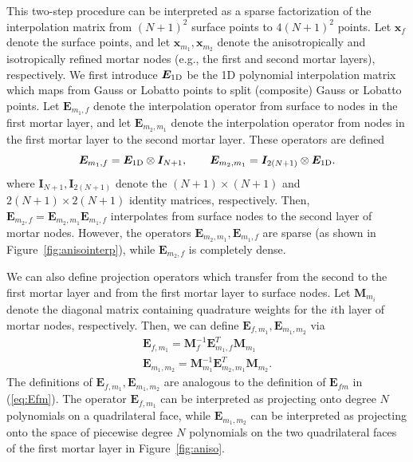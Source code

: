 \documentclass{svjour3}                     %
\begin{document}
This two-step procedure can be interpreted as a sparse factorization of the interpolation matrix from $(N+1)^2$ surface points to $4(N+1)^2$ points.  Let $\bm{x}_f$ denote the surface points, and let $\bm{x}_{m_1}, \bm{x}_{m_2}$ denote the anisotropically and isotropically refined mortar nodes (e.g., the first and second mortar layers), respectively.  We first introduce $\bm{E}_{\rm 1D}$ be the 1D polynomial interpolation matrix which maps from Gauss or Lobatto points to split (composite) Gauss or Lobatto points.  Let $\bm{E}_{m_1,f}$ denote the interpolation operator from surface to nodes in the first mortar layer, and let $\bm{E}_{m_2,m_1}$ denote the interpolation operator from nodes in the first mortar layer to the second mortar layer.  These operators are defined 
\[
\bm{E}_{m_1,f} = \bm{E}_{\rm 1D} \otimes \bm{I}_{N+1}, \qquad \bm{E}_{m_2,m_1} = \bm{I}_{2(N+1)} \otimes \bm{E}_{\rm 1D}.
\]
where $\bm{I}_{N+1},\bm{I}_{2(N+1)}$ denote the $(N+1)\times (N+1)$ and $2(N+1)\times 2(N+1)$ identity matrices, respectively.  Then, $\bm{E}_{m_2,f} = \bm{E}_{m_2,m_1}\bm{E}_{m_1,f}$ interpolates from surface nodes to the second layer of mortar nodes.  However, the operators $\bm{E}_{m_2,m_1}, \bm{E}_{m_1,f}$ are sparse (as shown in Figure~\ref{fig:anisointerp}), while $\bm{E}_{m_2,f}$ is completely dense.  

We can also define projection operators which transfer from the second to the first mortar layer and from the first mortar layer to surface nodes.  Let $\bm{M}_{m_i}$ denote the diagonal matrix containing quadrature weights for the $i$th layer of mortar nodes, respectively.  Then, we can define $\bm{E}_{f,m_1},\bm{E}_{m_1,m_2}$ via
\begin{align*}
\bm{E}_{f,m_1} = \bm{M}_f^{-1}\bm{E}_{m_1,f}^T\bm{M}_{m_1}\\
\bm{E}_{m_1,m_2} = \bm{M}_{m_1}^{-1}\bm{E}_{m_2,m_1}^T\bm{M}_{m_2}.
\end{align*}
The definitions of $\bm{E}_{f,m_1}, \bm{E}_{m_1,m_2}$ are analogous to the definition of $\bm{E}_{fm}$ in (\ref{eq:Efm}).  The operator $\bm{E}_{f,m_1}$ can be interpreted as projecting onto degree $N$ polynomials on a quadrilateral face, while $\bm{E}_{m_1,m_2}$ can be interpreted as projecting onto the space of piecewise degree $N$ polynomials on the two quadrilateral faces of the first mortar layer in Figure~\ref{fig:aniso}.
\end{document}
